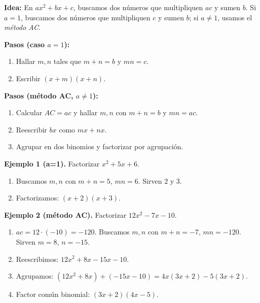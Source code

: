 
\textbf{Idea:} En $ax^2 + bx + c$, buscamos dos números que multipliquen $ac$ y sumen $b$. Si $a=1$, buscamos dos números que multipliquen $c$ y sumen $b$; si $a\neq 1$, usamos el \emph{método AC}.

\textbf{Pasos (caso $a=1$):}
\begin{enumerate}
  \item Hallar $m,n$ tales que $m+n=b$ y $mn=c$.
  \item Escribir $(x+m)(x+n)$.
\end{enumerate}

\textbf{Pasos (método AC, $a\neq 1$):}
\begin{enumerate}
  \item Calcular $AC=ac$ y hallar $m,n$ con $m+n=b$ y $mn=ac$.
  \item Reescribir $bx$ como $mx+nx$.
  \item Agrupar en dos binomios y factorizar por agrupación.
\end{enumerate}

\begin{example}
\textbf{Ejemplo 1 (a=1).} Factorizar $x^2 + 5x + 6$.
\begin{enumerate}
  \item Buscamos $m,n$ con $m+n=5$, $mn=6$. Sirven $2$ y $3$.
  \item Factorizamos: $(x+2)(x+3)$.
\end{enumerate}
\end{example}

\begin{example}
\textbf{Ejemplo 2 (método AC).} Factorizar $12x^2 - 7x - 10$.
\begin{enumerate}
  \item $ac=12\cdot(-10)=-120$. Buscamos $m,n$ con $m+n=-7$, $mn=-120$. Sirven $m=8$, $n=-15$.
  \item Reescribimos: $12x^2 + 8x - 15x - 10$.
  \item Agrupamos: $(12x^2+8x)+(-15x-10)=4x(3x+2)-5(3x+2)$.
  \item Factor común binomial: $(3x+2)(4x-5)$.
\end{enumerate}
\end{example}


